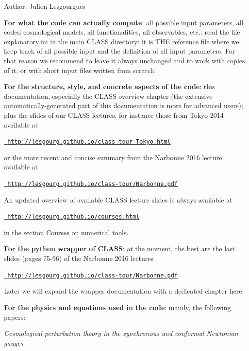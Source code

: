 Author\+: Julien Lesgourgues


\begin{DoxyItemize}
\item {\bfseries{For what the code can actually compute}}\+: all possible input parameters, all coded cosmological models, all functionalities, all observables, etc.\+: read the file {\ttfamily explanatory.\+ini} in the main {\ttfamily CLASS} directory\+: it is THE reference file where we keep track of all possible input and the definition of all input parameters. For that reason we recommend to leave it always unchanged and to work with copies of it, or with short input files written from scratch.
\item {\bfseries{For the structure, style, and concrete aspects of the code}}\+: this documentation, especially the {\ttfamily CLASS overview} chapter (the extensive automatically-\/generated part of this documentation is more for advanced users); plus the slides of our {\ttfamily CLASS} lectures, for instance those from Tokyo 2014 available at

{\ttfamily \href{http://lesgourg.github.io/class-tour-Tokyo.html}{\texttt{ http\+://lesgourg.\+github.\+io/class-\/tour-\/\+Tokyo.\+html}}}

or the more recent and concise summary from the Narbonne 2016 lecture available at

{\ttfamily \href{http://lesgourg.github.io/class-tour/Narbonne.pdf}{\texttt{ http\+://lesgourg.\+github.\+io/class-\/tour/\+Narbonne.\+pdf}}}

An updated overview of available {\ttfamily CLASS} lecture slides is always available at

{\ttfamily \href{http://lesgourg.github.io/courses.html}{\texttt{ http\+://lesgourg.\+github.\+io/courses.\+html}}}

in the section {\ttfamily Courses on numerical tools}.
\item {\bfseries{For the python wrapper of {\ttfamily CLASS}}}\+: at the moment, the best are the last slides (pages 75-\/96) of the Narbonne 2016 lectures

{\ttfamily \href{http://lesgourg.github.io/class-tour/Narbonne.pdf}{\texttt{ http\+://lesgourg.\+github.\+io/class-\/tour/\+Narbonne.\+pdf}}}

Later we will expand the wrapper documentation with a dedicated chapter here.
\item {\bfseries{For the physics and equations used in the code}}\+: mainly, the following papers\+:
\begin{DoxyItemize}
\item {\itshape Cosmological perturbation theory in the synchronous and conformal Newtonian gauges}


\end{DoxyItemize}
\end{DoxyItemize}
